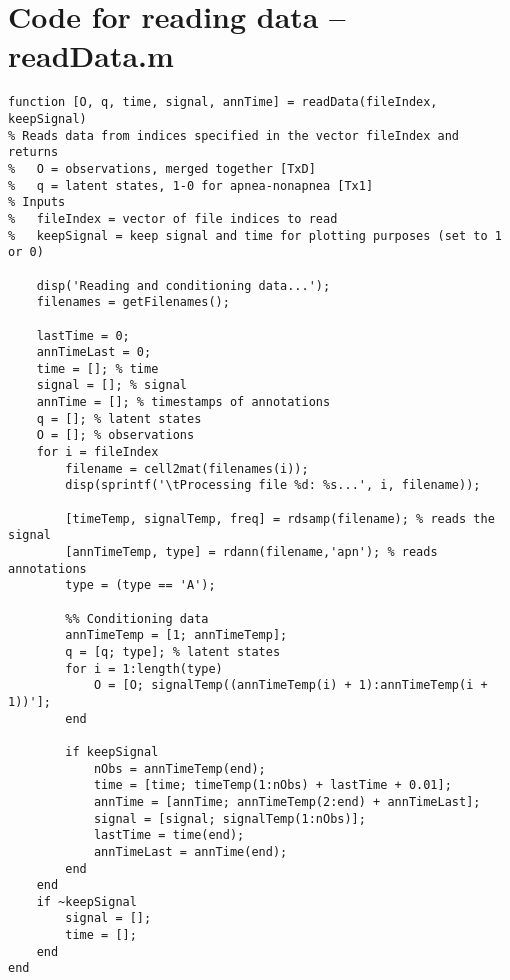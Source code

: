 \chapter{Code for reading data -- readData.m}
\label{ch:readData}
\begin{lstlisting}
function [O, q, time, signal, annTime] = readData(fileIndex, keepSignal)
% Reads data from indices specified in the vector fileIndex and returns
%   O = observations, merged together [TxD]
%   q = latent states, 1-0 for apnea-nonapnea [Tx1]
% Inputs
%   fileIndex = vector of file indices to read
%   keepSignal = keep signal and time for plotting purposes (set to 1 or 0)
    
    disp('Reading and conditioning data...');
    filenames = getFilenames();
    
    lastTime = 0;
    annTimeLast = 0;
    time = []; % time
    signal = []; % signal
    annTime = []; % timestamps of annotations
    q = []; % latent states
    O = []; % observations
    for i = fileIndex
        filename = cell2mat(filenames(i));
        disp(sprintf('\tProcessing file %d: %s...', i, filename));
        
        [timeTemp, signalTemp, freq] = rdsamp(filename); % reads the signal
        [annTimeTemp, type] = rdann(filename,'apn'); % reads annotations
        type = (type == 'A');

        %% Conditioning data
        annTimeTemp = [1; annTimeTemp];
        q = [q; type]; % latent states
        for i = 1:length(type)
            O = [O; signalTemp((annTimeTemp(i) + 1):annTimeTemp(i + 1))'];
        end
        
        if keepSignal
            nObs = annTimeTemp(end);
            time = [time; timeTemp(1:nObs) + lastTime + 0.01];
            annTime = [annTime; annTimeTemp(2:end) + annTimeLast];
            signal = [signal; signalTemp(1:nObs)];
            lastTime = time(end);
            annTimeLast = annTime(end);
        end
    end
    if ~keepSignal
        signal = [];
        time = [];
    end
end
\end{lstlisting}